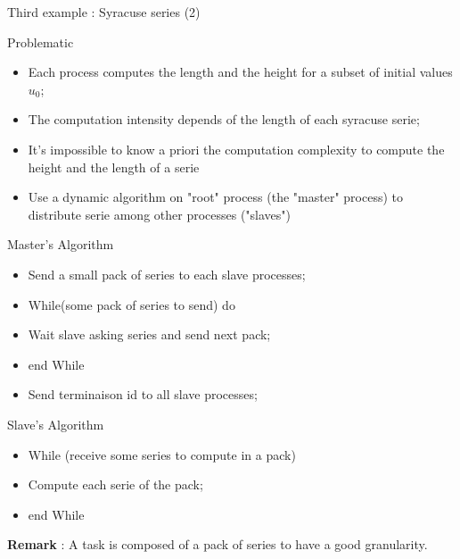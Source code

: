 \documentclass[compress,10pt,aspectratio=169]{beamer}
\begin{document}
\begin{frame}[fragile]{Third example : Syracuse series (2)}
    \scriptsize
    \begin{block}{\small Problematic}
        \begin{itemize}
            \item Each process computes the length and the height for a subset of initial values $u_{0}$;
            \item The computation intensity depends of the length of each syracuse serie;
            \item It's impossible to know a priori the computation complexity to compute the height and the length of a serie
            \item Use a dynamic algorithm on "root" process (the "master" process) to distribute serie among other processes ("slaves")
        \end{itemize}
    \end{block}

    \begin{multicols}{2}
        \begin{exampleblock}{\small Master's Algorithm}
            \begin{itemize}
                \item Send a small pack of series to each slave processes;
                \item While(some pack of series to send) do 
                \item \hspace*{2mm}Wait slave asking series and send next pack;
                \item end While
                \item Send terminaison id to all slave processes;
            \end{itemize}
        \end{exampleblock}
    

        \begin{exampleblock}{\small Slave's Algorithm}
            \begin{itemize}
                \item While (receive some series to compute in a pack)
                \item \hspace*{2mm}Compute each serie of the pack;
                \item end While
            \end{itemize}
        \end{exampleblock}
    \end{multicols}

    \textbf{Remark} : A task is composed of a pack of series to have a good granularity.

\end{frame}
\end{document}

